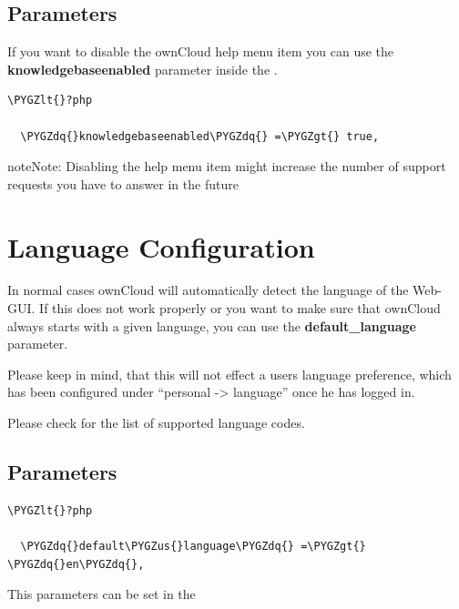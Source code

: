 \documentclass[letterpaper,10pt,english]{sphinxmanual}
\def\PYGZus{\char`\_}
\def\PYGZlt{\char`\<}
\def\PYGZgt{\char`\>}
\def\PYGZdq{\char`\"}
\begin{document}
\subsection{Parameters}
\label{configuration_server/knowledgebase_configuration:parameters}
If you want to disable the ownCloud help menu item you can use the \textbf{knowledgebaseenabled} parameter inside the
.

\begin{Verbatim}[commandchars=\\\{\}]
\PYGZlt{}?php

  \PYGZdq{}knowledgebaseenabled\PYGZdq{} =\PYGZgt{} true,
\end{Verbatim}

\begin{notice}{note}{Note:}
Disabling the help menu item might increase the number of support requests you have to answer in the future
\end{notice}


\section{Language Configuration}
\label{configuration_server/language_configuration::doc}\label{configuration_server/language_configuration:language-configuration}
In normal cases ownCloud will automatically detect the language of the Web-GUI.
If this does not work properly or you want to make sure that ownCloud always
starts with a given language, you can use the \textbf{default\_language} parameter.

Please keep in mind, that this will not effect a users language preference,
which has been configured under ``personal -\textgreater{} language'' once he has logged in.

Please check  for the list of supported language
codes.


\subsection{Parameters}
\label{configuration_server/language_configuration:parameters}
\begin{Verbatim}[commandchars=\\\{\}]
\PYGZlt{}?php

  \PYGZdq{}default\PYGZus{}language\PYGZdq{} =\PYGZgt{} \PYGZdq{}en\PYGZdq{},
\end{Verbatim}

This parameters can be set in the 
\end{document}
